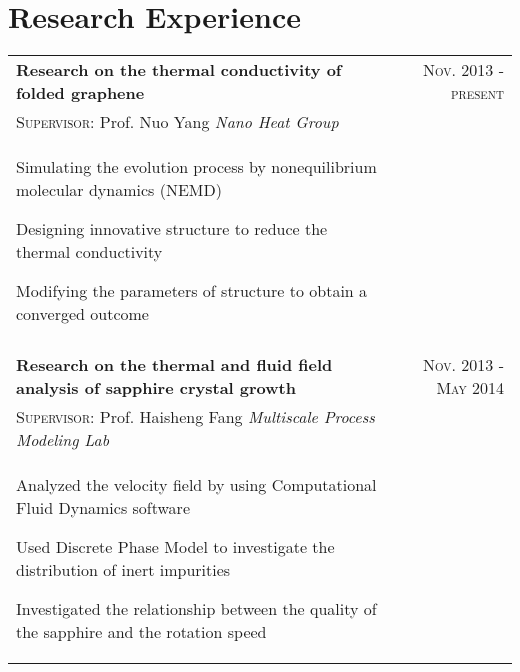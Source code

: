 \documentclass[a4paper,10pt]{article}
\begin{document}
\section{Research Experience}
\begin{tabular}{p{14cm}r}
\textbf{Research on the thermal conductivity of folded graphene}  &\textsc{Nov. 2013} - \textsc{present} \\
\hspace{1em}\textsc{Supervisor:} Prof. Nuo Yang \hspace{18em} \emph{Nano Heat Group} & \vspace{-0.5em}\\
\begin{compactitem}
       \item Simulating the evolution process by nonequilibrium molecular dynamics (NEMD)\vspace{0.2em}
       \item Designing innovative structure to reduce the thermal conductivity\vspace{0.2em}
       \item Modifying the parameters of structure to obtain a converged outcome
     \end{compactitem}&\vspace{-1em} \\
\multicolumn{2}{c}{} \\
\textbf{Research on the thermal and fluid field analysis of sapphire crystal growth}  &\textsc{Nov. 2013 - May 2014} \\
\hspace{1em} \textsc{Supervisor:} Prof. Haisheng Fang \hspace{10em} \emph{Multiscale Process Modeling Lab}  & \vspace{-0.5em} \\
\begin{compactitem}
       \item Analyzed the velocity field by using Computational Fluid Dynamics software\vspace{0.2em}
       \item Used Discrete Phase Model to investigate the distribution of inert impurities\vspace{0.2em}
       \item Investigated the relationship between the quality of the sapphire and the rotation speed
     \end{compactitem}&\vspace{-1em} \\

\end{tabular}
\end{document}
